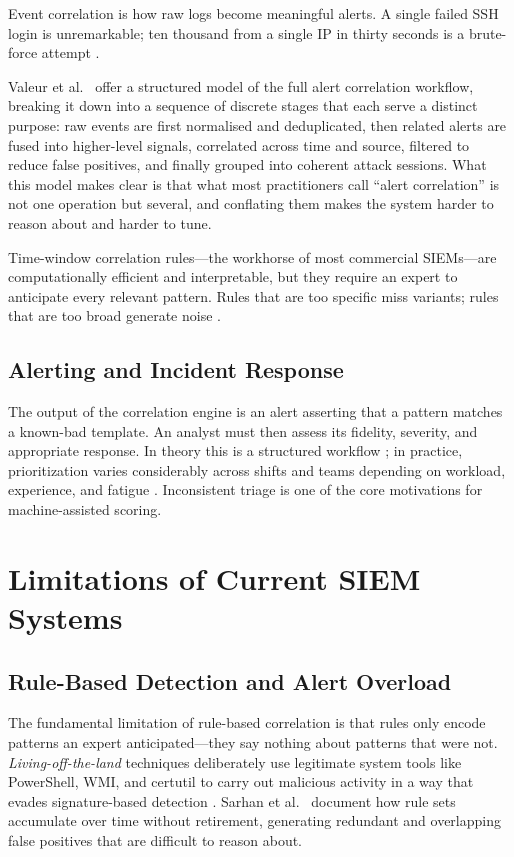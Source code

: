 Event correlation is how raw logs become meaningful alerts. A single failed SSH login is unremarkable; ten thousand from a single IP in thirty seconds is a brute-force attempt \cite{valeur2004alert}.

Valeur et al.\ \cite{valeur2004alert} offer a structured model of the full alert
correlation workflow, breaking it down into a sequence of discrete stages that each
serve a distinct purpose: raw events are first normalised and deduplicated, then
related alerts are fused into higher-level signals, correlated across time and source,
filtered to reduce false positives, and finally grouped into coherent attack sessions.
What this model makes clear is that what most practitioners call ``alert correlation''
is not one operation but several, and conflating them makes the system harder to reason
about and harder to tune.

Time-window correlation rules---the workhorse of most commercial SIEMs---are computationally efficient and interpretable, but they require an expert to anticipate every relevant pattern. Rules that are too specific miss variants; rules that are too broad generate noise \cite{valeur2004alert, rulegenie2025}.

\subsection{Alerting and Incident Response}

The output of the correlation engine is an alert asserting that a pattern matches a known-bad template. An analyst must then assess its fidelity, severity, and appropriate response. In theory this is a structured workflow \cite{nist80061}; in practice, prioritization varies considerably across shifts and teams depending on workload, experience, and fatigue \cite{tilbury2024humans}. Inconsistent triage is one of the core motivations for machine-assisted scoring.

\section{Limitations of Current SIEM Systems}

\subsection{Rule-Based Detection and Alert Overload}

The fundamental limitation of rule-based correlation is that rules only encode patterns an expert anticipated---they say nothing about patterns that were not. \textit{Living-off-the-land} techniques deliberately use legitimate system tools like PowerShell, WMI, and certutil to carry out malicious activity in a way that evades signature-based detection \cite{strom2018attack}. Sarhan et al.\ \cite{rulegenie2025} document how rule sets accumulate over time without retirement, generating redundant and overlapping false positives that are difficult to reason about.

